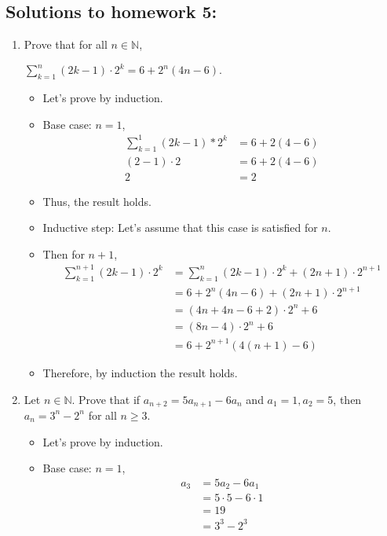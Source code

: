 \documentclass[letterpaper,12pt]{article}
\begin{document}
\subsection*{Solutions to homework 5:}

\begin{enumerate}
\item Prove that for all $n\in \mathbb{N}$,
\begin{center}
	$\sum_{k=1}^{n} (2k-1) \cdot2^k=6+2^n(4n-6).$
\end{center}
\begin{itemize}
	\item Let's prove by induction.
	\item Base case: $n=1$, 
	\begin{align}
		\sum_{k=1}^{1}(2k-1)*2^k&=6+2(4-6) \\ (2-1)\cdot 2&=6+2(4-6) \\ 2 &= 2
	\end{align}
	\item Thus, the result holds.
	\item Inductive step: Let's assume that this case is satisfied for $n$.
	\item Then for $n+1$,
	\begin{align}
		\sum_{k=1}^{n+1}(2k-1)\cdot 2^k &= \sum_{k=1}^{n} (2k-1)\cdot2^k+(2n+1)\cdot2^{n+1} \\&=6+2^n(4n-6) + (2n+1)\cdot 2^{n+1} \\&= (4n+4n-6+2)\cdot 2^n +6 \\ &=(8n-4)\cdot 2^n+6 \\&=6+2^{n+1}(4(n+1)-6)
	\end{align}
	\item Therefore, by induction the result holds.
\end{itemize}
\item Let $n\in\mathbb{N}.$ Prove that if $a_{n+2} = 5a_{n+1}-6a_n$ and $a_1=1,a_2=5$, then $a_n=3^n-2^n$ for all $n \geq 3$.
\begin{itemize}
	\item Let's prove by induction.
	\item Base case: $n=1$,
	\begin{align}
		a_3 &= 5a_2-6a_1 \\ &=5 \cdot5 -6\cdot 1 \\&=19 \\&= 3^3-2^3

\end{align}
\end{itemize}
\end{enumerate}
\end{document}

